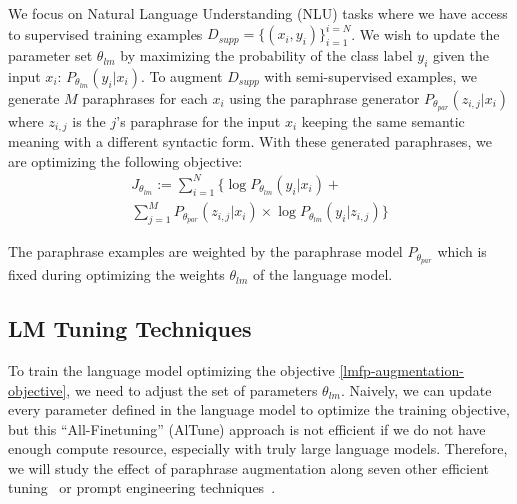 \documentclass[11pt]{article}
\begin{document}
We focus on Natural Language Understanding (NLU) tasks where we have access to supervised training examples $D_{supp} = \{(x_i, y_i)\}^{i=N}_{i=1}$. We wish to update the parameter set $\theta_{lm}$ by maximizing the probability of the class label $y_i$ given the input $x_i$: $P_{\theta_{lm}} (y_i | x_i)$. To augment $D_{supp}$ with semi-supervised examples, we generate $M$ paraphrases for each $x_i$ using the paraphrase generator $P_{\theta_{par}} (z_{i,j} | x_{i})$ where $z_{i,j}$ is the $j$'s paraphrase for the input $x_{i}$ keeping the same semantic meaning with a different syntactic form. With these generated paraphrases, we are optimizing the following objective:
\begin{multline}
    J_{\theta_{lm}} := \sum^{N}_{i=1} \{ \log P_{\theta_{lm}} (y_i | x_i) + \\
    \sum^{M}_{j=1} P_{\theta_{par}} (z_{i,j} | x_{i}) \times \log P_{\theta_{lm}} (y_i | z_{i,j})\}
\label{lmfp-augmentation-objective}
\end{multline}  

The paraphrase examples are weighted by the paraphrase model $P_{\theta_{par}}$ which is fixed during optimizing the weights $\theta_{lm}$ of the language model.

\subsection{LM Tuning Techniques}
To train the language model optimizing the objective \ref{lmfp-augmentation-objective}, we need to adjust the set of parameters $\theta_{lm}$. Naively, we can update every parameter defined in the language model to optimize the training objective, but this ``All-Finetuning'' (AlTune) approach is not efficient if we do not have enough compute resource, especially with truly large language models. Therefore, we will study the effect of paraphrase augmentation along seven other efficient tuning~\cite{pmlr-v97-houlsby19a} or prompt engineering techniques~\cite{liu2021pretrain}. 
\end{document}
